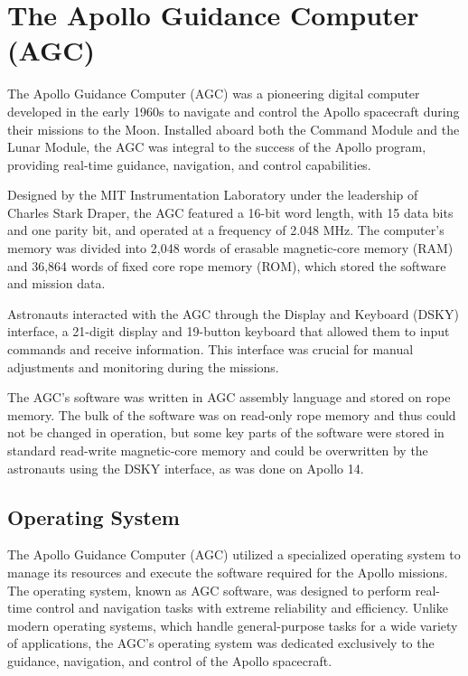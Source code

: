 \section{The Apollo Guidance Computer (AGC)}

The Apollo Guidance Computer (AGC) was a pioneering digital computer developed in the
early 1960s to navigate and control the Apollo spacecraft during their missions to the
Moon. Installed aboard both the Command Module and the Lunar Module, the AGC was
integral to the success of the Apollo program, providing real-time guidance,
navigation, and control capabilities.

Designed by the MIT Instrumentation Laboratory under the leadership of Charles Stark
Draper, the AGC featured a 16-bit word length, with 15 data bits and one parity bit,
and operated at a frequency of 2.048 MHz. The computer's memory was divided into 2,048
words of erasable magnetic-core memory (RAM) and 36,864 words of fixed core rope memory
(ROM), which stored the software and mission data. 

Astronauts interacted with the AGC through the Display and Keyboard (DSKY) interface, a
21-digit display and 19-button keyboard that allowed them to input commands and receive
information. This interface was crucial for manual adjustments and monitoring during
the missions. 

The AGC's software was written in AGC assembly language and stored on rope memory. The
bulk of the software was on read-only rope memory and thus could not be changed in
operation, but some key parts of the software were stored in standard read-write
magnetic-core memory and could be overwritten by the astronauts using the DSKY
interface, as was done on Apollo 14.


\subsection{Operating System}

The Apollo Guidance Computer (AGC) utilized a specialized operating system to manage
its resources and execute the software required for the Apollo missions. The operating
system, known as AGC software, was designed to perform real-time control and navigation
tasks with extreme reliability and efficiency. Unlike modern operating systems, which
handle general-purpose tasks for a wide variety of applications, the AGC's operating
system was dedicated exclusively to the guidance, navigation, and control of the Apollo
spacecraft.

